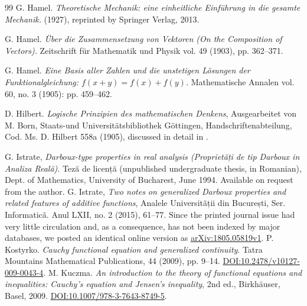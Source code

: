\documentclass[11pt]{amsart} %
\theoremstyle{definition}
\newcommand{\R}{\mathbb{R}}
\begin{document}
\begin{thebibliography}{99}
 G. Hamel. 
\newblock \emph{Theoretische Mechanik: eine einheitliche Einführung in die gesamte Mechanik.} 
\newblock (1927), reprinted by Springer Verlag, 2013.

 G. Hamel. 
\newblock \emph{Über die Zusammensetzung von Vektoren (On the Composition of Vectors).}
\newblock Zeitschrift für Mathematik und Physik vol. 49 (1903), pp. 362--371. 

 G. Hamel. 
\newblock \emph{Eine Basis aller Zahlen und die unstetigen Lösungen der Funktionalgleichung: $f(x+y)= f(x)+ f(y)$.} 
\newblock Mathematische Annalen vol. 60, no. 3 (1905): pp. 459--462.

 D. Hilbert. 
\newblock \emph{Logische Prinzipien des mathematischen Denkens}, Ausgearbeitet von M. Born, Staats-und Universitätsbibliothek Göttingen, Handschriftenabteilung, Cod. Ms. D. Hilbert 558a (1905), discussed in detail in \cite{31}. 

 G. Istrate, \emph{Darboux-type properties in real analysis (Proprietăți de tip Darboux in Analiza Reală)}. Teză de licență (unpublished undergraduate thesis, in Romanian), Dept. of Mathematics, University of Bucharest, June 1994. Available on request from the author. 
 G. Istrate, \emph{Two notes on generalized Darboux properties and related features of additive functions}, Analele Universit\~ații din București, Ser. Informatic\~{a}.  Anul LXII, no. 2 (2015), 61--77.
Since the printed journal issue had very little circulation and, as a consequence, has not been indexed by major databases, we posted an identical online version as %
\href{https://doi.org/10.48550/arXiv.1805.05819}{arXiv:1805.05819v1}. 
 P. Kostyrko. \emph{Cauchy functional equation and generalized continuity}. Tatra Mountains Mathematical Publications, 44 (2009), pp. 9--14. \href{https://doi.org/10.2478/v10127-009-0043-4}{DOI:10.2478/v10127-009-0043-4}. 
 M. Kuczma. \emph{An introduction to the theory of functional equations and inequalities: Cauchy's equation and Jensen's inequality}, 2nd ed., Birkh\"auser, Basel, 2009. \href{https://doi.org/10.1007/978-3-7643-8749-5}{DOI:10.1007/978-3-7643-8749-5}.



\end{thebibliography}
\end{document}
